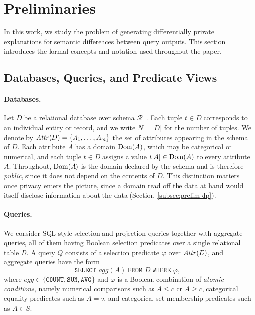 
\section{Preliminaries}
\label{sec:preliminaries}

In this work, we study the problem of generating differentially private explanations
for semantic differences between query outputs.
This section introduces the formal concepts and notation used throughout the paper.

\subsection{Databases, Queries, and Predicate Views}
\label{subsec:prelim-db-queries}

\paragraph{Databases.}
Let $D$ be a relational database over schema $\mathcal{R}$~\cite{Foundations}.
Each tuple $t \in D$ corresponds to an individual entity or record, and we write
$N=|D|$ for the number of tuples.
We denote by $\mathit{Attr}(D)=\{A_1,\ldots,A_m\}$ the set of attributes appearing in the
schema of $D$.
Each attribute $A$ has a domain $\operatorname{Dom}(A)$, which may be categorical or numerical,
and each tuple $t\in D$ assigns a value $t[A]\in\operatorname{Dom}(A)$ to every attribute $A$.
Throughout, $\operatorname{Dom}(A)$ is the domain declared by the schema and is therefore
\emph{public}, since it does not depend on the contents of $D$.
This distinction matters once privacy enters the picture, since a domain read off
the data at hand would itself disclose information about the data
(Section~\ref{subsec:prelim-dp}).

\paragraph{Queries.}
We consider SQL-style selection and projection queries together with aggregate
queries, all of them having Boolean selection predicates over a single
relational table $D$.
A query $Q$ consists of a selection predicate $\varphi$ over $\mathit{Attr}(D)$, and
aggregate queries have the form
\[
\texttt{SELECT } agg(A)
\texttt{ FROM } D
\texttt{ WHERE } \varphi ,
\]
where $agg \in \{\texttt{COUNT},\texttt{SUM},\texttt{AVG}\}$ and
$\varphi$ is a Boolean combination of \emph{atomic conditions}, namely numerical
comparisons such as $A \leq c$ or $A \geq c$, categorical equality predicates
such as $A = v$, and categorical set-membership predicates such as $A \in S$.


